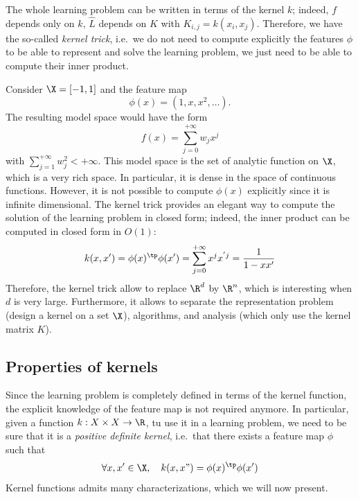 \documentclass{../cs-classes/cs-classes}
\begin{document}
\begin{remark}
    The whole learning problem can be written in terms of the kernel $k$; indeed, $f$ depends only on $k$, $\hat{L}$ depends on $K$ with $K_{i, j} = k(x_i, x_j)$. Therefore, we have the so-called \emph{kernel trick}, i.e.~we do not need to compute explicitly the features $\phi$ to be able to represent and solve the learning problem, we just need to be able to compute their inner product.
\end{remark}

\begin{example}
    \leavevmode
    
    \noindent
    Consider $\X=\lbrack-1, 1\rbrack$ and the feature map
    \begin{equation*}
        \phi(x)=(1, x, x^2, \dots).
    \end{equation*}
    The resulting model space would have the form
    \begin{equation*}
        f(x)=\sum_{j=0}^{+\infty}w_jx^j
    \end{equation*}
    with $\sum_{j=1}^{+\infty}w_j^2 < +\infty$. This model space is the set of analytic function on $\X$, which is a very rich space. In particular, it is dense in the space of continuous functions. However, it is not possible to compute $\phi(x)$ explicitly since it is infinite dimensional. The kernel trick provides an elegant way to compute the solution of the learning problem in closed form; indeed, the inner product can be computed in closed form in $O(1)$:
    \begin{equation*}
        k(x, x') = \phi(x)^\tp\phi(x')=\sum_{j=0}^{+\infty}x^jx^{'j} = \frac{1}{1-xx'}
    \end{equation*}
    Therefore, the kernel trick allow to replace $\R^d$ by $\R^n$, which is interesting when $d$ is very large. Furthermore, it allows to separate the representation problem (design a kernel on a set $\X$), algorithms, and analysis (which only use the kernel matrix $K$).
\end{example}

\subsection{Properties of kernels}
Since the learning problem is completely defined in terms of the kernel function, the explicit knowledge of the feature map is not required anymore. In particular, given a function $k:X\times X \to \R$, tu use it in a learning problem, we need to be sure that it is a \emph{positive definite kernel}, i.e.~that there exists a feature map $\phi$ such that
\begin{equation*}
    \forall x, x'\in\X, \quad k(x, x") = \phi(x)^\tp \phi(x')
\end{equation*}
Kernel functions admits many characterizations, which we will now present.
\end{document}
